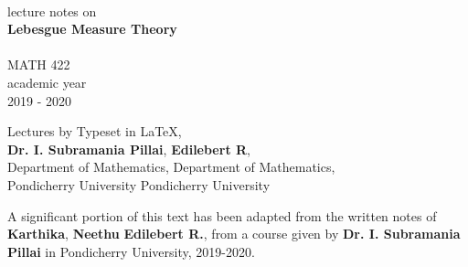 \documentclass[a4paper]{book}
\begin{document}
\begin{center}
\phantom{xxx} \vspace{7cm} \\
{\LARGE \sc lecture notes on} \\[8pt]
{\Huge \sc \bf Lebesgue Measure Theory} \\
\HRule \\ MATH 422 \\[1cm]
{\sc academic year} \\[3pt] {\Large 2019 - 2020} \\[5cm]
\end{center}
{\large Lectures by \hfill Typeset in \LaTeX, \\[2pt]
{ \bf Dr. I. Subramania Pillai},  \hfill {\bf Edilebert R}, \\[2pt]
Department of Mathematics, \hfill Department of Mathematics, \\[2pt]
Pondicherry University \hfill Pondicherry University}
\newpage
\begin{center}
A significant portion of this text has been adapted from the written notes of {\bf Karthika}, {\bf Neethu} {\bf Edilebert R.}, from a course given by {\bf Dr. I. Subramania Pillai} in Pondicherry University, 2019-2020.
\end{center}
\tableofcontents
{}
\end{document}
